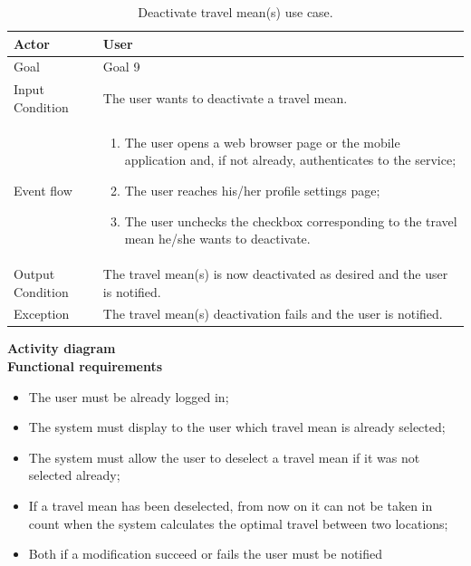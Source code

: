 \documentclass{article}
\begin{document}
	\begin{table}[htp]
	\caption{Deactivate travel mean(s) use case.}
		\begin{center}
    			\begin{tabular}{p{}|p{}}
   			 	\hline
    				Actor & User \\ \hline
    				Goal & Goal 9 \\ \hline
    				Input Condition & The user wants to deactivate a travel mean. \\ \hline
    				Event flow & 
				\begin{enumerate}
  					\item The user opens a web browser page or the mobile application and, if not already, authenticates to the service;
  					\item The user reaches his/her profile settings page;
  					\item The user unchecks the checkbox corresponding to the travel mean he/she wants to deactivate.
 				 \end{enumerate} \\ \hline
    				Output Condition & The travel mean(s) is now deactivated as desired and the user is notified. \\ \hline
    				Exception & The travel mean(s) deactivation fails and the user is notified. \\ \hline
    			\end{tabular}
		\end{center}
	\end{table}
	
	\bigskip
	\noindent
	\textbf{Activity diagram} \\
	
	
	\bigskip
	\noindent
	\textbf{Functional requirements} \\
	\begin{itemize}
		\item The user must be already logged in;
		\item The system must display to the user which travel mean is already selected;
		\item The system must allow the user to deselect a travel mean if it was not selected already;
		\item If a travel mean has been deselected, from now on it can not be taken in count when the system calculates the optimal travel between two locations;
		\item Both if a modification succeed or fails the user must be notified
	\end{itemize}
\end{document}

